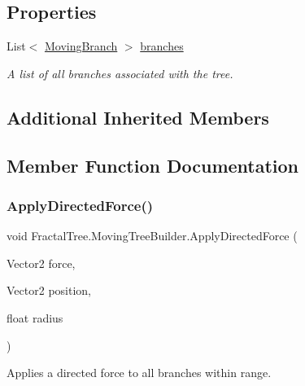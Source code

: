\subsection*{Properties}
\begin{DoxyCompactItemize}
\item 
List$<$ \hyperlink{interface_fractal_tree_1_1_moving_branch}{Moving\+Branch} $>$ \hyperlink{class_fractal_tree_1_1_moving_tree_builder_aca75f30f0c8170efd0b62eca6eee9e00}{branches}
\begin{DoxyCompactList}\small\item\em A list of all branches associated with the tree. \end{DoxyCompactList}\end{DoxyCompactItemize}
\subsection*{Additional Inherited Members}


\subsection{Member Function Documentation}
\hypertarget{class_fractal_tree_1_1_moving_tree_builder_a7da9440aa0482b959854bb28ff281a9a}{}\label{class_fractal_tree_1_1_moving_tree_builder_a7da9440aa0482b959854bb28ff281a9a} 
\subsubsection{\texorpdfstring{Apply\+Directed\+Force()}{ApplyDirectedForce()}}
{\footnotesize\ttfamily void Fractal\+Tree.\+Moving\+Tree\+Builder.\+Apply\+Directed\+Force (\begin{DoxyParamCaption}\item[{Vector2}]{force,  }\item[{Vector2}]{position,  }\item[{float}]{radius }\end{DoxyParamCaption})}



Applies a directed force to all branches within range. 


